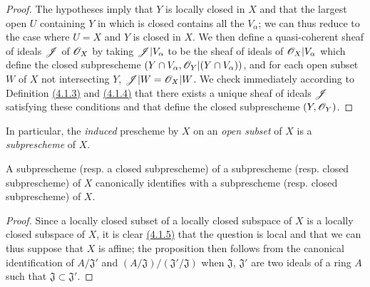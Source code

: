 \begin{proof}
\label{proof-prop-1.4.1.5}
The hypotheses imply that $Y$ is locally closed in $X$ and that the largest open $U$
containing $Y$ in which is closed contains all the $V_\alpha$; we can thus reduce to the case
where $U=X$ and $Y$ is closed in $X$. We then define a quasi-coherent sheaf of ideals
$\mathscr{J}$ of $\mathscr{O}_X$ by taking $\mathscr{J}|V_\alpha$ to be the sheaf of ideals of $\mathscr{O}_X|V_\alpha$
which define the closed subprescheme $(Y\cap V_\alpha,\mathscr{O}_Y|(Y\cap V_\alpha))$, and for each
open subset $W$ of $X$ not intersecting $Y$, $\mathscr{J}|W=\mathscr{O}_X|W$. We check immediately
according to Definition \hyperref[defn-1.4.1.3]{(4.1.3)} and \hyperref[env-1.4.1.4]{(4.1.4)}
that there exists a unique sheaf of ideals $\mathscr{J}$ satisfying these conditions and that
define the closed subprescheme $(Y,\mathscr{O}_Y)$.
\end{proof}

In particular, the {\it induced} prescheme by $X$ on an {\it open subset} of $X$ is a
{\it subprescheme} of $X$.

\begin{prop}[4.1.6]
\label{prop-1.4.1.6}
A subprescheme (resp. a closed subprescheme) of a subprescheme
(resp. closed subprescheme) of $X$ canonically identifies with a subprescheme
(resp. closed subprescheme) of $X$.
\end{prop}

\begin{proof}
\label{proof-prop-1.4.1.6}
Since a locally closed subset of a locally closed subspace of $X$ is a locally closed
subspace of $X$, it is clear \hyperref[prop-1.4.1.5]{(4.1.5)} that the question is local
and that we can thus suppose that $X$ is affine; the proposition then follows from the
canonical identification of $A/\mathfrak{J}'$ and
$(A/\mathfrak{J})/(\mathfrak{J}'/\mathfrak{J})$ when $\mathfrak{J}$, $\mathfrak{J}'$ are
two ideals of a ring $A$ such that $\mathfrak{J}\subset\mathfrak{J}'$.
\end{proof}

